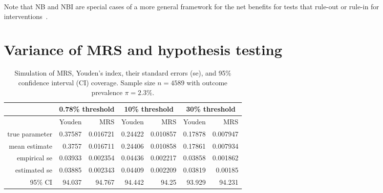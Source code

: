 \documentclass[AMA,STIX1COL]{WileyNJD-v2}
\begin{document}
Note that NB and NBI are special cases of a more general framework for the net benefits for tests that rule-out or rule-in for interventions~\cite{Pennello2016}.






\section{Variance of MRS and hypothesis testing}

\begin{table}%
	\caption{Simulation of MRS, Youden's index, their standard errors (se), and 95\% confidence interval (CI) coverage.  Sample size $n=4589$ with outcome prevalence $\pi=2.3\%$.}
	\begin{tabular}{|r|r|r|r|r|r|r|}
		\hline
		\multicolumn{1}{|r|}{} & \multicolumn{2}{c|}{0.78\% threshold} & \multicolumn{2}{c|}{10\% threshold} & \multicolumn{2}{c|}{30\% threshold}  \\ \hline
		\multicolumn{1}{|r|}{} & Youden & MRS   & Youden & MRS   & Youden & MRS \\
		\hline
		true parameter & 0.37587 & 0.016721 & 0.24422 & 0.010857 & 0.17878 & 0.007947 \\
		mean estimate & 0.3757 & 0.016711 & 0.24406 & 0.010858 & 0.17861 & 0.007934 \\
		empirical se & 0.03933 & 0.002354 & 0.04436 & 0.002217 & 0.03858 & 0.001862 \\
		estimated se & 0.03885 & 0.002343 & 0.04409 & 0.002209 & 0.03819 & 0.00185 \\
		95\% CI & 94.037 & 94.767 & 94.442 & 94.25 & 93.929 & 94.231 \\
		\hline
	\end{tabular}%
	
	\label{tab:simulation}%
\end{table}%
\end{document}
